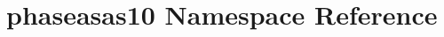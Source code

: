 \hypertarget{namespacephaseasas10}{\section{phaseasas10 Namespace Reference}
\label{namespacephaseasas10}
}
